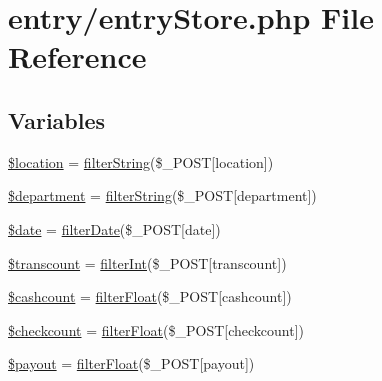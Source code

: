 \hypertarget{entry_store_8php}{}\section{entry/entry\+Store.php File Reference}
\label{entry_store_8php}
\subsection*{Variables}
\begin{DoxyCompactItemize}
\item 
\hyperlink{entry_store_8php_ac319193077976bb217112e5a7b7b8022}{\$location} = \hyperlink{entry_library_8php_aa1a0f8c5ca5cd64b0ec9034a769d0a54}{filter\+String}(\$\+\_\+\+P\+O\+ST\mbox{[}\textquotesingle{}location\textquotesingle{}\mbox{]})
\item 
\hyperlink{entry_store_8php_af5cc7499478fa9b6d7f9670f6a8521a0}{\$department} = \hyperlink{entry_library_8php_aa1a0f8c5ca5cd64b0ec9034a769d0a54}{filter\+String}(\$\+\_\+\+P\+O\+ST\mbox{[}\textquotesingle{}department\textquotesingle{}\mbox{]})
\item 
\hyperlink{entry_store_8php_a481c918f8d853749e00b5942cabf599a}{\$date} = \hyperlink{entry_library_8php_a2710911dba21b4ef81d746296ac33b1e}{filter\+Date}(\$\+\_\+\+P\+O\+ST\mbox{[}\textquotesingle{}date\textquotesingle{}\mbox{]})
\item 
\hyperlink{entry_store_8php_a63fbfb73628737f907460ff60b5dca1f}{\$transcount} = \hyperlink{entry_library_8php_af8b4d6af446ee1a1da82accb07140c6f}{filter\+Int}(\$\+\_\+\+P\+O\+ST\mbox{[}\textquotesingle{}transcount\textquotesingle{}\mbox{]})
\item 
\hyperlink{entry_store_8php_a175ae5360f80b9afcc39b1491f4ff56f}{\$cashcount} = \hyperlink{entry_library_8php_af071373943df9bc67a10f149e87cf4f6}{filter\+Float}(\$\+\_\+\+P\+O\+ST\mbox{[}\textquotesingle{}cashcount\textquotesingle{}\mbox{]})
\item 
\hyperlink{entry_store_8php_aff7cc4d027f444fb1e9c4356364a641a}{\$checkcount} = \hyperlink{entry_library_8php_af071373943df9bc67a10f149e87cf4f6}{filter\+Float}(\$\+\_\+\+P\+O\+ST\mbox{[}\textquotesingle{}checkcount\textquotesingle{}\mbox{]})
\item 
\hyperlink{entry_store_8php_ae344e604ec98f96f5ad2075e96f20095}{\$payout} = \hyperlink{entry_library_8php_af071373943df9bc67a10f149e87cf4f6}{filter\+Float}(\$\+\_\+\+P\+O\+ST\mbox{[}\textquotesingle{}payout\textquotesingle{}\mbox{]})
\item 

\end{DoxyCompactItemize}
